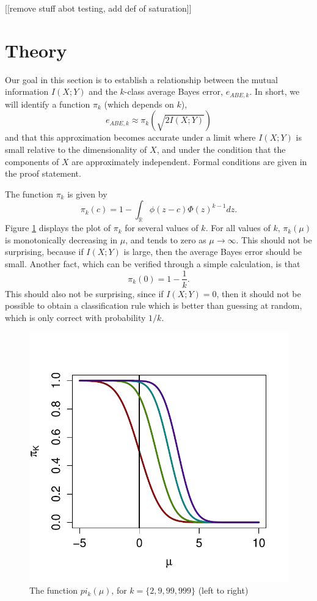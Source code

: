 \documentclass{article}
\begin{document}
[[remove stuff abot testing, add def of saturation]]

\section{Theory}

Our goal in this section is to establish a relationship between the
mutual information $I(X; Y)$ and the $k$-class average Bayes error,
$e_{ABE, k}$.  In short, we will identify a function $\pi_k$
(which depends on $k$),
\[
e_{ABE, k} \approx \pi_k(\sqrt{2 I(X; Y)})
\]
and that this approximation becomes accurate under a limit where $I(X; Y)$ is small relative to the dimensionality of $X$,
and under the condition that the components of $X$ are approximately independent.  Formal conditions are given in the proof statement.

The function $\pi_k$ is given by
\[
\pi_k(c) = 1 - \int_{\mathbb{R}} \phi(z - c)  \Phi(z)^{k-1} dz.
\]
Figure \ref{fig:pi} displays the plot of $\pi_k$ for several values of $k$.
For all values of $k$, $\pi_k(\mu)$ is monotonically decreasing in $\mu$, and tends to zero as $\mu \to \infty$.
This should not be surprising, because if $I(X; Y)$ is large, then the average Bayes error should be small.
Another fact, which can be verified through a simple calculation, is that 
\[
\pi_k(0) = 1 - \frac{1}{k}.
\]
This should also not be surprising, since if $I(X; Y) = 0$, then it should not be possible to
obtain a classification rule which is better than guessing at random, which is only correct with probability $1/k$.
\begin{figure}
\centering
\includegraphics[scale = 0.5, clip=true, trim=0 0.2in 0 0.5in]{../info_theory_sims/illus_piK.pdf}
\caption{The function $pi_k(\mu)$, for $k = \{2, 9, 99, 999\}$ (left to right) \label{fig:pi}}
\end{figure}
\end{document}
